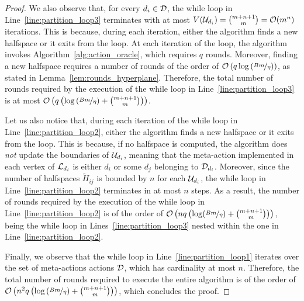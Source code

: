 \begin{proof}
We also observe that, for every $d_i \in \mathcal{D}$, the while loop in Line~\ref{line:partition_loop3} terminates with at most $V(\mathcal{U}_{d_i}) =  \binom{m + n +1}{m}  = \mathcal{O}(m^{n})$ iterations. This is because, during each iteration, either the algorithm finds a new halfspace or it exits from the loop.
%
At each iteration of the loop, the algorithm invokes Algorithm~\ref{alg:action_oracle}, which requires $q$ rounds.
%
Moreover, finding a new halfspace requires a number of rounds of the order of $\mathcal{O}\left(q \log \left(\nicefrac{Bm}{\eta}\right)\right)$, as stated in Lemma~\ref{lem:rounds_hyperplane}. Therefore, the total number of rounds required by the execution of the while loop in Line~\ref{line:partition_loop3} is at most $\mathcal{O} \left( q \left( \log \left(\nicefrac{Bm}{\eta}\right) + \binom{m + n +1}{m} \right) \right)$.

Let us also notice that, during each iteration of the while loop in Line~\ref{line:partition_loop2}, either the algorithm finds a new halfspace or it exits from the loop. This is because, if no halfspace is computed, the algorithm does \emph{not} update the boundaries of $\mathcal{U}_{d_i}$, meaning that the meta-action implemented in each vertex of $\mathcal{L}_{d_i}$ is either $d_i$ or some $d_j$ belonging to $\mathcal{D}_{d_i}$. Moreover, since the number of halfspaces $\widetilde{H}_{ij}$ is bounded by $n$ for each $\mathcal{U}_{d_i}$, the while loop in Line~\ref{line:partition_loop2} terminates in at most $n$ steps. As a result, the number of rounds required by the execution of the while loop in Line~\ref{line:partition_loop2} is of the order of $\mathcal{O} \left( n q \left( \log (\nicefrac{Bm}{\eta}) + \binom{m + n +1}{m}  \right) \right)$, being the while loop in Lines~\ref{line:partition_loop3} nested within the one in Line~\ref{line:partition_loop2}.

Finally, we observe that the while loop in Line~\ref{line:partition_loop1} iterates over the set of meta-actions actions $\mathcal{D}$, which has cardinality at most $n$. Therefore, the total number of rounds required to execute the entire algorithm is of the order of $\mathcal{O} \left( n^2 q \left( \log \left(\nicefrac{Bm}{\eta}\right) + \binom{ m + n +1}{m} \right) \right)$, which concludes the proof. 
\end{proof}




